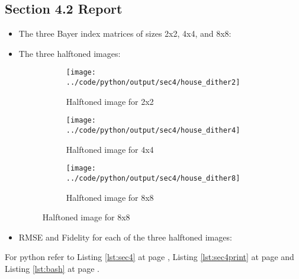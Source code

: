 \documentclass[a4paper,11pt]{article}
\newcommand{\reflst}[1]{Listing \ref{#1} at page \pageref{#1}}
\begin{document}
\subsection*{Section 4.2 Report} 
\begin{itemize}
\item The three Bayer index matrices of sizes 2x2, 4x4, and 8x8:
    
 
\item The three halftoned images:
\begin{figure}[!hp]
  \centering
 \begin{subfigure}{0.3\textwidth}
  \texttt{[image: ../code/python/output/sec4/house\_dither2]}
 \caption{Halftoned image for 2x2}
 \end{subfigure}
 \begin{subfigure}{0.3\textwidth}
  \texttt{[image: ../code/python/output/sec4/house\_dither4]}
 \caption{Halftoned image for 4x4}
 \end{subfigure}
 \begin{subfigure}{0.3\textwidth}
  \texttt{[image: ../code/python/output/sec4/house\_dither8]}
 \caption{Halftoned image for 8x8}
 \end{subfigure}
 \end{figure}
 
\item RMSE and Fidelity for each of the three halftoned images:
 
 
 
\end{itemize} 
For python refer to \reflst{lst:sec4}, \reflst{lst:sec4print} and \reflst{lst:bash}.

\clearpage
\end{document}

